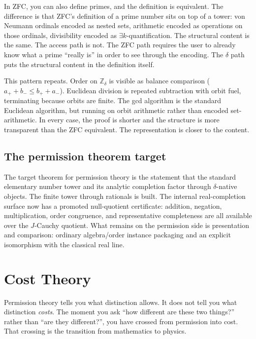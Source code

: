 \documentclass[11pt,a4paper]{article}
\theoremstyle{definition}
\theoremstyle{remark}
\begin{document}
In ZFC, you can also define primes, and the definition is equivalent.
The difference is that ZFC's definition of a prime number sits on top
of a tower: von Neumann ordinals encoded as nested sets, arithmetic
encoded as operations on those ordinals, divisibility encoded as
$\exists k$-quantification. The structural content is the same. The
access path is not. The ZFC path requires the user to already know what
a prime ``really is'' in order to see through the encoding. The $\delta$
path puts the structural content in the definition itself.

This pattern repeats. Order on $\mathbb{Z}_\delta$ is visible as
balance comparison ($a_+ + b_- \leq b_+ + a_-$). Euclidean division
is repeated subtraction with orbit fuel, terminating because orbits
are finite. The gcd algorithm is the standard Euclidean algorithm, but
running on orbit arithmetic rather than encoded set-arithmetic.
In every case, the proof is shorter and the structure is more transparent
than the ZFC equivalent. The representation is closer to the content.

\subsection{The permission theorem target}

The target theorem for permission theory is the statement that the standard
elementary number tower and its analytic completion factor through
$\delta$-native objects. The finite tower through rationals is built. The
internal real-completion surface now has a promoted null-quotient certificate:
addition, negation, multiplication, order congruence, and representative
completeness are all available over the $J$-Cauchy quotient. What remains on
the permission side is presentation and comparison: ordinary algebra/order
instance packaging and an explicit isomorphism with the classical real line.

\section{Cost Theory}\label{sec:cost}

Permission theory tells you what distinction allows. It does not tell you what
distinction \emph{costs}. The moment you ask ``how different are these two
things?'' rather than ``are they different?'', you have crossed from
permission into cost. That crossing is the transition from mathematics to
physics.
\end{document}
